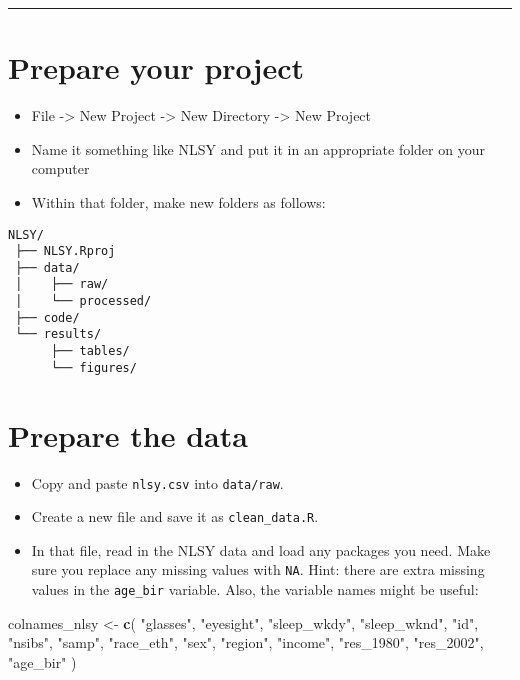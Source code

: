 \documentclass[11pt]{scrartcl}
\newenvironment{Shaded}{\begin{snugshade}}{\end{snugshade}}
\newcommand{\KeywordTok}[1]{\textcolor[rgb]{0.13,0.29,0.53}{\textbf{#1}}}
\newcommand{\NormalTok}[1]{#1}
\newcommand{\StringTok}[1]{\textcolor[rgb]{0.31,0.60,0.02}{#1}}
\providecommand{\tightlist}{%
  \setlength{\itemsep}{0pt}\setlength{\parskip}{0pt}}
\renewcommand{\rmdefault}{\sfdefault}
\newcommand*{\TitleFont}{%
      \fontsize{17}{10}%
      \selectfont}
\newcommand*{\AuthFont}{%
      \fontsize{13}{12}%
      \selectfont}
\begin{document}
\begin{flushleft}
  \TitleFont{\textbf{Final challenge}}
    \AuthFont{October 18, 2019}
  
  \end{flushleft}
\vspace{-4.5ex}
\par\noindent\rule{.35\textwidth}{0.6pt}

\hypertarget{prepare-your-project}{%
\section{Prepare your project}\label{prepare-your-project}}

\begin{itemize}
\tightlist
\item
  File -\textgreater{} New Project -\textgreater{} New Directory
  -\textgreater{} New Project
\item
  Name it something like NLSY and put it in an appropriate folder on
  your computer
\item
  Within that folder, make new folders as follows:
\end{itemize}

\begin{verbatim}
NLSY/
 ├── NLSY.Rproj
 ├── data/
 │    ├── raw/
 │    └── processed/
 ├── code/
 └── results/
      ├── tables/
      └── figures/
\end{verbatim}

\hypertarget{move-files-around}{%
\section{Prepare the data}\label{move-files-around}}

\begin{itemize}
\tightlist
\item
  Copy and paste \texttt{nlsy.csv} into \texttt{data/raw}.
\item
  Create a new file and save it as \texttt{clean\_data.R}.
\item
  In that file, read in the NLSY data and load any packages you need.
  Make sure you replace any missing values with \texttt{NA}. Hint: there
  are extra missing values in the \texttt{age\_bir} variable. Also, the
  variable names might be useful:
\end{itemize}

\begin{Shaded}
\begin{Highlighting}[]
\NormalTok{colnames_nlsy <-}\StringTok{ }\KeywordTok{c}\NormalTok{(}
  \StringTok{"glasses"}\NormalTok{, }\StringTok{"eyesight"}\NormalTok{, }\StringTok{"sleep_wkdy"}\NormalTok{, }\StringTok{"sleep_wknd"}\NormalTok{,}
  \StringTok{"id"}\NormalTok{, }\StringTok{"nsibs"}\NormalTok{, }\StringTok{"samp"}\NormalTok{, }\StringTok{"race_eth"}\NormalTok{, }\StringTok{"sex"}\NormalTok{, }\StringTok{"region"}\NormalTok{,}
  \StringTok{"income"}\NormalTok{, }\StringTok{"res_1980"}\NormalTok{, }\StringTok{"res_2002"}\NormalTok{, }\StringTok{"age_bir"}
\NormalTok{)}
\end{Highlighting}
\end{Shaded}
\end{document}
